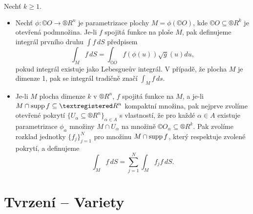 \documentclass[12pt]{article}                   %
\begin{document}
        \begin{definice}
            Nechť $k ≥ 1$.

            \begin{itemize}
                \item Nechť $\phi: ©O \rightarrow ®R^n$ je parametrizace plochy $M = \phi(©O)$, kde $©O \subseteq ®R^k$ je otevřená podmnožina. Je-li $f$ spojitá funkce na ploše $M$, pak definujeme integrál prvního druhu $\int f\, dS$ předpisem
                    $$ \int_M f\,dS = \int_{©O}f(\phi(u))\sqrt{g}(u)du, $$
                    pokud integrál existuje jako Lebesgueův integrál. V případě, že plocha $M$ je dimenze 1, pak se integrál tradičně značí $\int_M f\,ds$.
                \item Je-li $M$ plocha dimenze $k$ v $®R^n$, $f$ spojitá funkce na $M$, a je-li $M \cap \supp f \subseteq ®R^n$ kompaktní množina, pak nejprve zvolíme otevřené pokrytí $\{U_\alpha \subseteq ®R^n\}_{\alpha \in A}$ s vlastností, že pro každé $\alpha \in A$ existuje parametrizace $\phi_\alpha$ množiny $M \cap U_\alpha$ na množině $©O_\alpha \subseteq ®R^k$. Pak zvolíme rozklad jednotky $\{f_j\}_{j=1}^N$ pro množinu $M \cap \operatorname{supp} f$, který respektuje zvolené pokrytí, a definujeme
                    $$ \int_M f\,dS = \sum_{j=1}^N \int_M f_jf\,dS. $$ 
            \end{itemize}
        \end{definice}

\section{Tvrzení -- Variety}
\end{document}
